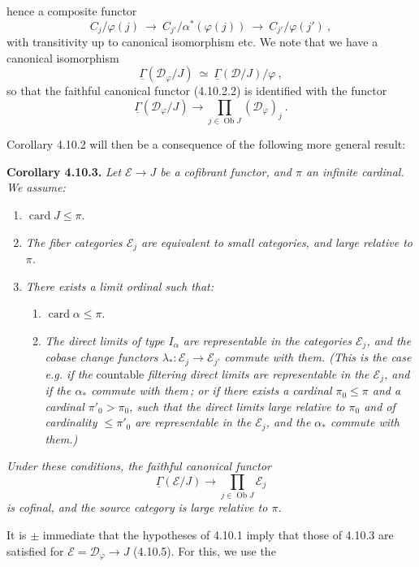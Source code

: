 \documentclass[11pt]{article}
\newcommand{\printedpage}[1]{\marginpar{\footnotesize p.~#1}}
\newcommand{\msp}[1]{\marginpar{\footnotesize [#1]}}
\newcommand{\uGamma}{\underline{\Gamma}}
\newcommand{\Ob}{\operatorname{Ob}}
\newcommand{\card}{\operatorname{card}}
\begin{document}
\printedpage{93}

\msp{page 247}
hence a composite functor
\[
C_j/\varphi(j) \ \longrightarrow \ C_{j'}/\alpha^*(\varphi(j)) \ \longrightarrow \ C_{j'}/\varphi(j') \ ,
\]
with transitivity up to canonical isomorphism etc. We note that we have a canonical isomorphism
\[
\uGamma(\mathcal{D}_\varphi/J) \ \simeq \ \uGamma(\mathcal{D}/J)/\varphi \ ,
\]
so that the faithful canonical functor (4.10.2.2) is identified with the functor
\[
\uGamma(\mathcal{D}_\varphi/J) \longrightarrow \prod_{j\in\Ob J} (\mathcal{D}_\varphi)_j \ . \tag*{(4.10.6)}
\]

Corollary 4.10.2 will then be a consequence of the following more general result:

\textbf{Corollary 4.10.3.} \textit{Let $\mathcal{E} \longrightarrow J$ be a cofibrant functor, and $\pi$ an infinite cardinal. We assume:}
\begin{enumerate}[label={}, leftmargin=3em]
\item[\textit{a)}] $\card J \leqslant \pi$.
\item[\textit{b)}] \textit{The fiber categories $\mathcal{E}_j$ are equivalent to small categories, and large relative to $\pi$.}
\item[\textit{c)}] \textit{There exists a limit ordinal such that:}
\begin{enumerate}[label={}, leftmargin=3em]
\item[\textit{1°)}] $\card \alpha \leqslant \pi$.
\item[\textit{2°)}] \msp{page 248}\textit{The direct limits of type $I_\alpha$ are representable in the categories $\mathcal{E}_j$, and the cobase change functors $\lambda_* : \mathcal{E}_j \longrightarrow \mathcal{E}_{j'}$ commute with them. (This is the case e.g. if the} countable \textit{filtering direct limits are representable in the $\mathcal{E}_j$, and if the $\alpha_*$ commute with them\,; or if there exists a cardinal $\pi_0 \leqslant \pi$ and a cardinal $\pi'_0 > \pi_0$, such that the direct limits large relative to $\pi_0$ and of cardinality $\leqslant \pi'_0$ are representable in the $\mathcal{E}_j$, and the $\alpha_*$ commute with them.)}
\end{enumerate}
\end{enumerate}
\textit{Under these conditions, the faithful canonical functor}
\[
\uGamma(\mathcal{E}/J) \longrightarrow \prod_{j\in\Ob J} \mathcal{E}_j \tag*{(4.10.3.1)}
\]
\textit{is cofinal, and the source category is large relative to $\pi$.}

It is $\pm$ immediate that the hypotheses of 4.10.1 imply that those of 4.10.3 are satisfied for $\mathcal{E} = \mathcal{D}_\varphi \longrightarrow J$ (4.10.5). For
\msp{page 249}
this, we use the
\end{document}

